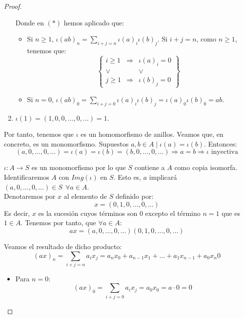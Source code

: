 \begin{proof}
\begin{enumerate}
        Donde en $(\ast)$ hemos aplicado que:
        \begin{itemize}
            \item Si $n \geq 1$, $\iota(ab)_n = \sum\limits_{i+j=n} \iota(a)_i \iota(b)_j$. Si $i+j=n$, como $n \geq 1$, tenemos que:
            \begin{equation*}
                \left\{\begin{array}{ccc}
                    i\geq 1 & \Longrightarrow & \iota(a)_i=0\\
                    \lor&&\lor\\
                    j\geq 1 & \Longrightarrow & \iota(b)_j=0
                \end{array}\right\}
            \end{equation*}

            \item Si $n=0$, $\iota(ab)_0 = \sum\limits_{i+j=0} \iota(a)_i \iota(b)_j=\iota(a)_0 \iota(b)_0 = ab$.
        \end{itemize}

        

        \item $\iota(1)=(1,0,0,\dots,0,\dots)=1$.
    \end{enumerate}

    Por tanto, tenemos que $\iota$ es un homomorfismo de anillos. Veamos que, en concreto, es un monomorfismo.
    Supuestos $a,b \in A \mid \iota(a) = \iota(b)$. Entonces:
    $$(a, 0, \ldots, 0, \ldots) = \iota(a) = \iota(b) = (b, 0, \ldots, 0, \ldots) \Longrightarrow a=b \Longrightarrow \iota \mbox{ inyectiva}$$

    
    $\iota:A \longrightarrow S$ es un monomorfismo por lo que $S$ contiene a $A$ como copia isomorfa.\newline
    Identificaremos $A$ con $Img(\iota)$ en $S$. Esto es, $a$ implicará $(a, 0, \ldots, 0, \ldots) \in S~~\forall a \in A$.\\

    
    Denotaremos por $x$ al elemento de $S$ definido por:
    $$x = (0, 1, 0, \ldots, 0, \ldots)$$
    Es decir, $x$ es la sucesión cuyos términos son $0$ excepto el término $n=1$ que es $1 \in A$. Tenemos por tanto, que $\forall a \in A$:
    $$ax = (a, 0, \ldots, 0, \ldots) (0, 1, 0, \ldots, 0, \ldots)$$

    Veamos el resultado de dicho producto:
    $$(ax)_n = \sum_{i+j=n} a_i x_j = a_n x_0 + a_{n-1} x_1 + \ldots + a_1 x_{n-1} + a_0 x_n0$$
    \begin{itemize}
        \item Para $n=0$:
        $$(ax)_0 = \sum_{i+j = 0} a_i x_j = a_0 x_0 = a \cdot 0 = 0$$


\end{itemize}
\end{proof}
